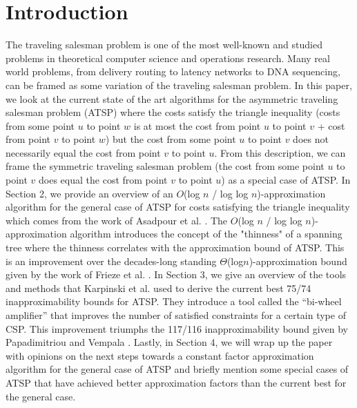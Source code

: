 \documentclass[oneside]{projectpaper} %
\begin{document}
\section{Introduction}
The traveling salesman problem is one of the most well-known and studied problems in theoretical computer science and operations research. Many real world problems, from delivery routing to latency networks to DNA sequencing, can be framed as some variation of the traveling salesman problem. In this paper, we look at the current state of the art algorithms for the asymmetric traveling salesman problem (ATSP) where the costs satisfy the triangle inequality (costs from some point $u$ to point $w$ is at most the cost from point $u$ to point $v$ + cost from point $v$ to point $w$) but the cost from some point $u$ to point $v$ does not necessarily equal the cost from point $v$ to point $u$. From this description, we can frame the symmetric traveling salesman problem (the cost from some point $u$ to point $v$ does equal the cost from point $v$ to point $u$) as a special case of ATSP. \newline
\indent In Section 2, we provide an overview of an $O$(log $n$ / log log $n$)-approximation algorithm for the general case of ATSP for costs satisfying the triangle inequality which comes from the work of Asadpour et al. \cite{AGM10}. The $O$(log $n$ / log log $n$)-approximation algorithm introduces the concept of the "thinness" of a spanning tree where the thinness correlates with the approximation bound of ATSP. This is an improvement over the decades-long standing $\Theta$(log$n$)-approximation bound given by the work of Frieze et al. \cite{FGM83}. \newline
\indent In Section 3, we give an overview of the tools and methods that Karpinski et al. \cite{KLS15} used to derive the current best 75/74 inapproximability bounds for ATSP. They introduce a tool called the ``bi-wheel amplifier'' that improves the number of satisfied constraints for a certain type of CSP. This improvement triumphs the 117/116 inapproximability bound given by Papadimitriou and Vempala \cite{PV06}.  \newline
\indent Lastly, in Section 4, we will wrap up the paper with opinions on the next steps towards a constant factor approximation algorithm for the general case of ATSP and briefly mention some special cases of ATSP that have achieved better approximation factors than the current best for the general case.

\end{document}
